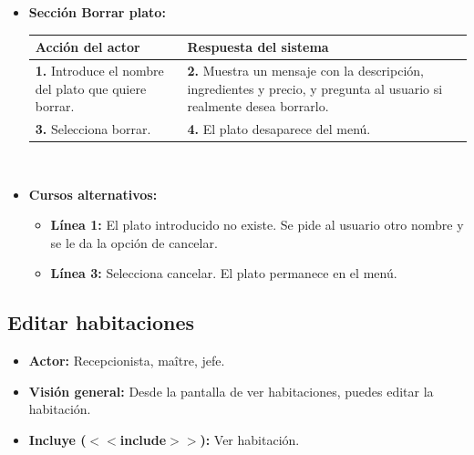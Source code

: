 \documentclass[spanish,a4paper,11pt, twoside]{report}	%
\begin{document}
\begin{itemize}
\begin{itemize}
			\end {itemize}
			
			\item \textbf{Sección Borrar plato:} 	\\
				\begin{tabular}{|p{6cm}||p{6cm}|}
				\hline
				\textbf{Acción del actor} & \textbf{Respuesta del sistema} \\ \hline \hline
				\textbf{1.} Introduce el nombre del plato que quiere borrar. & \textbf{2.} Muestra un mensaje con la descripción, ingredientes y precio, y pregunta al usuario si realmente desea borrarlo.\\ \hline 
				\textbf{3.} Selecciona borrar. & \textbf{4.} El plato desaparece del menú. \\ \hline
			\end{tabular}
			\\
			\item \textbf{Cursos alternativos:} 
			\begin{itemize}
			\item  \textbf{Línea 1:} El plato introducido no existe. Se pide al usuario otro nombre y se le da la opción de cancelar.
			\item  \textbf{Línea 3:} Selecciona cancelar. El plato permanece en el menú.
			\end {itemize}
		\end {itemize}



	\subsection{Editar habitaciones}
		\begin{itemize}
			\item \textbf{Actor:} Recepcionista, maître, jefe.
			\item \textbf{Visión general:} Desde la pantalla de ver habitaciones, puedes editar la habitación.	
			\item \textbf{Incluye ($<<$include$>>$):} Ver habitación.
		\end {itemize}

	
	\hspace{-2 true cm}
\end{document}
